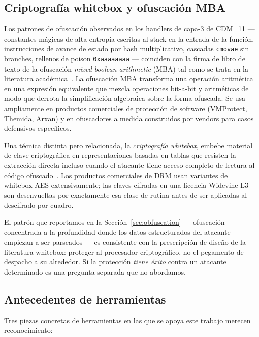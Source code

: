 \documentclass[11pt,letterpaper]{article}
\begin{document}
\subsection{Criptografía whitebox y ofuscación MBA}
\label{sec:ante-whitebox}

Los patrones de ofuscación observados en los handlers de capa-3
de CDM\_11 --- constantes mágicas de alta entropía escritas al
stack en la entrada de la función, instrucciones de avance de
estado por hash multiplicativo, cascadas \texttt{cmovae} sin
branches, rellenos de poison \texttt{0xaaaaaaaa} --- coinciden con
la firma de libro de texto de la ofuscación
\emph{mixed-boolean-arithmetic} (MBA) tal como se trata en la
literatura académica~\cite{eyrolles-mba, biondi-mba}. La ofuscación
MBA transforma una operación aritmética en una expresión
equivalente que mezcla operaciones bit-a-bit y aritméticas de modo
que derrota la simplificación algebraica sobre la forma ofuscada.
Se usa ampliamente en productos comerciales de protección de
software (VMProtect, Themida, Arxan) y en ofuscadores a medida
construidos por vendors para casos defensivos específicos.

Una técnica distinta pero relacionada, la \emph{criptografía
whitebox}, embebe material de clave criptográfica en
representaciones basadas en tablas que resisten la extracción
directa incluso cuando el atacante tiene acceso completo de
lectura al código ofuscado~\cite{chow-aes-whitebox,
lepoint-whitebox}. Los productos comerciales de DRM usan variantes
de whitebox-AES extensivamente; las claves cifradas en una
licencia Widevine L3 son desenvueltas por exactamente esa clase
de rutina antes de ser aplicadas al descifrado por-cuadro.

El patrón que reportamos en la Sección~\ref{sec:obfuscation} ---
ofuscación concentrada a la profundidad donde los datos
estructurados del atacante empiezan a ser parseados --- es
consistente con la prescripción de diseño de la literatura
whitebox: proteger al procesador criptográfico, no el pegamento
de despacho a su alrededor. Si la protección \emph{tiene éxito}
contra un atacante determinado es una pregunta separada que no
abordamos.

\subsection{Antecedentes de herramientas}
\label{sec:ante-tools}

Tres piezas concretas de herramientas en las que se apoya este
trabajo merecen reconocimiento:
\end{document}
